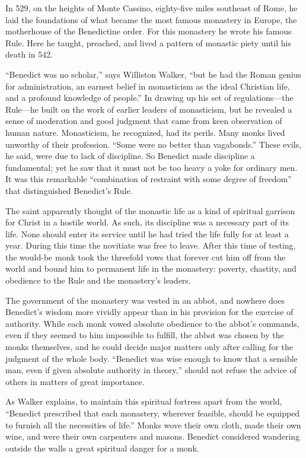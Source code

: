 In 529, on the heights of Monte Cassino, eighty-five miles southeast of Rome, he laid the
foundations of what became the most famous monastery in Europe, the motherhouse of the Benedictine
order. For this monastery he wrote his famous Rule. Here he taught, preached, and lived a pattern of
monastic piety until his death in 542.

“Benedict was no scholar,” says Williston Walker, “but he had the Roman genius for administration,
an earnest belief in monasticism as the ideal Christian life, and a profound knowledge of people.”
In drawing up his set of regulations—the Rule—he built on the work of earlier leaders of
monasticism, but he revealed a sense of moderation and good judgment that came from keen observation
of human nature. Monasticism, he recognized, had its perils. Many monks lived unworthy of their
profession. “Some were no better than vagabonds.” These evils, he said, were due to lack of
discipline. So Benedict made discipline a fundamental; yet he saw that it must not be too heavy a
yoke for ordinary men. It was this remarkable “combination of restraint with some degree of freedom”
that distinguished Benedict’s Rule.

The saint apparently thought of the monastic life as a kind of spiritual garrison for Christ in a
hostile world. As such, its discipline was a necessary part of its life. None should enter its
service until he had tried the life fully for at least a year. During this time the novitiate was
free to leave. After this time of testing, the would-be monk took the threefold vows that forever
cut him off from the world and bound him to permanent life in the monastery: poverty, chastity, and
obedience to the Rule and the monastery’s leaders.

The government of the monastery was vested in an abbot, and nowhere does Benedict’s wisdom more
vividly appear than in his provision for the exercise of authority. While each monk vowed absolute
obedience to the abbot’s commands, even if they seemed to him impossible to fulfill, the abbot was
chosen by the monks themselves, and he could decide major matters only after calling for the
judgment of the whole body. “Benedict was wise enough to know that a sensible man, even if given
absolute authority in theory,” should not refuse the advice of others in matters of great
importance.

As Walker explains, to maintain this spiritual fortress apart from the world, “Benedict prescribed
that each monastery, wherever feasible, should be equipped to furnish all the necessities of life.”
Monks wove their own cloth, made their own wine, and were their own carpenters and masons. Benedict
considered wandering outside the walls a great spiritual danger for a monk.

